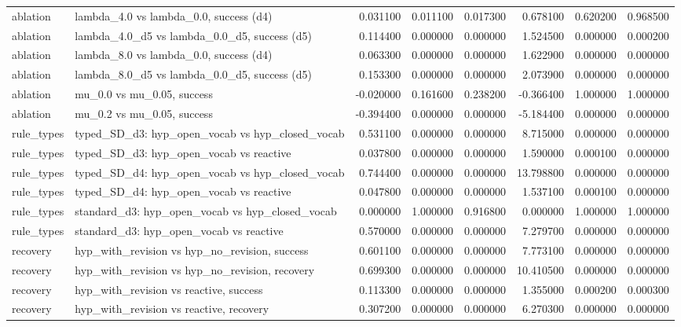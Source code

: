 \begin{tabular}{llrrrrrr}
ablation & lambda\_4.0 vs lambda\_0.0, success (d4) & 0.031100 & 0.011100 & 0.017300 & 0.678100 & 0.620200 & 0.968500 \\
ablation & lambda\_4.0\_d5 vs lambda\_0.0\_d5, success (d5) & 0.114400 & 0.000000 & 0.000000 & 1.524500 & 0.000000 & 0.000200 \\
ablation & lambda\_8.0 vs lambda\_0.0, success (d4) & 0.063300 & 0.000000 & 0.000000 & 1.622900 & 0.000000 & 0.000000 \\
ablation & lambda\_8.0\_d5 vs lambda\_0.0\_d5, success (d5) & 0.153300 & 0.000000 & 0.000000 & 2.073900 & 0.000000 & 0.000000 \\
ablation & mu\_0.0 vs mu\_0.05, success & -0.020000 & 0.161600 & 0.238200 & -0.366400 & 1.000000 & 1.000000 \\
ablation & mu\_0.2 vs mu\_0.05, success & -0.394400 & 0.000000 & 0.000000 & -5.184400 & 0.000000 & 0.000000 \\
rule\_types & typed\_SD\_d3: hyp\_open\_vocab vs hyp\_closed\_vocab & 0.531100 & 0.000000 & 0.000000 & 8.715000 & 0.000000 & 0.000000 \\
rule\_types & typed\_SD\_d3: hyp\_open\_vocab vs reactive & 0.037800 & 0.000000 & 0.000000 & 1.590000 & 0.000100 & 0.000000 \\
rule\_types & typed\_SD\_d4: hyp\_open\_vocab vs hyp\_closed\_vocab & 0.744400 & 0.000000 & 0.000000 & 13.798800 & 0.000000 & 0.000000 \\
rule\_types & typed\_SD\_d4: hyp\_open\_vocab vs reactive & 0.047800 & 0.000000 & 0.000000 & 1.537100 & 0.000100 & 0.000000 \\
rule\_types & standard\_d3: hyp\_open\_vocab vs hyp\_closed\_vocab & 0.000000 & 1.000000 & 0.916800 & 0.000000 & 1.000000 & 1.000000 \\
rule\_types & standard\_d3: hyp\_open\_vocab vs reactive & 0.570000 & 0.000000 & 0.000000 & 7.279700 & 0.000000 & 0.000000 \\
recovery & hyp\_with\_revision vs hyp\_no\_revision, success & 0.601100 & 0.000000 & 0.000000 & 7.773100 & 0.000000 & 0.000000 \\
recovery & hyp\_with\_revision vs hyp\_no\_revision, recovery & 0.699300 & 0.000000 & 0.000000 & 10.410500 & 0.000000 & 0.000000 \\
recovery & hyp\_with\_revision vs reactive, success & 0.113300 & 0.000000 & 0.000000 & 1.355000 & 0.000200 & 0.000300 \\
recovery & hyp\_with\_revision vs reactive, recovery & 0.307200 & 0.000000 & 0.000000 & 6.270300 & 0.000000 & 0.000000 \\

\end{tabular}
